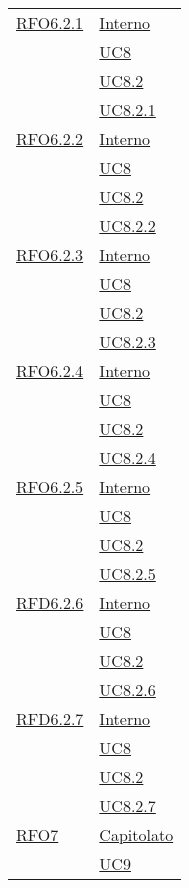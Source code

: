 \begin{longtable}{|>{\centering}m{5cm}|m{5cm}<{\centering}|}
 \hyperlink{RFO6.2.1}{RFO6.2.1} 
 & \hyperlink{Interno}{Interno}\\
 & \hyperref[UC8]{UC8}\\
 & \hyperref[UC8.2]{UC8.2}\\
  & \hyperref[UC8.2.1]{UC8.2.1}\\\hline
  
   \hyperlink{RFO6.2.2}{RFO6.2.2} 
   & \hyperlink{Interno}{Interno}\\
  & \hyperref[UC8]{UC8}\\
  & \hyperref[UC8.2]{UC8.2}\\
  & \hyperref[UC8.2.2]{UC8.2.2}\\\hline
  
   \hyperlink{RFO6.2.3}{RFO6.2.3} 
   & \hyperlink{Interno}{Interno}\\
  & \hyperref[UC8]{UC8}\\
  & \hyperref[UC8.2]{UC8.2}\\
  & \hyperref[UC8.2.3]{UC8.2.3}\\\hline
  
  \hyperlink{RFO6.2.4}{RFO6.2.4} 
  & \hyperlink{Interno}{Interno}\\
  & \hyperref[UC8]{UC8}\\
  & \hyperref[UC8.2]{UC8.2}\\
  & \hyperref[UC8.2.4]{UC8.2.4}\\\hline
  
   \hyperlink{RFO6.2.5}{RFO6.2.5} 
   & \hyperlink{Interno}{Interno}\\
  & \hyperref[UC8]{UC8}\\
  & \hyperref[UC8.2]{UC8.2}\\
  & \hyperref[UC8.2.5]{UC8.2.5}\\\hline
  
   \hyperlink{RFD6.2.6}{RFD6.2.6} 
   & \hyperlink{Interno}{Interno}\\
  & \hyperref[UC8]{UC8}\\
  & \hyperref[UC8.2]{UC8.2}\\
  & \hyperref[UC8.2.6]{UC8.2.6}\\\hline
  
  \hyperlink{RFD6.2.7}{RFD6.2.7} 
   & \hyperlink{Interno}{Interno}\\
  & \hyperref[UC8]{UC8}\\
  & \hyperref[UC8.2]{UC8.2}\\
  & \hyperref[UC8.2.7]{UC8.2.7}\\\hline
  
   \hyperlink{RFO7}{RFO7} 
   & \hyperlink{Capitolato}{Capitolato}\\
  & \hyperref[UC9]{UC9}\\\hline
  

\end{longtable}
